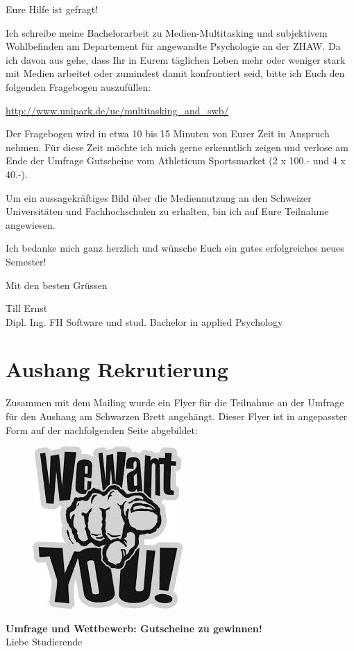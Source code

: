 \begin{RaggedRight}
Eure Hilfe ist gefragt!

Ich schreibe meine Bachelorarbeit zu Medien-Multitasking und subjektivem Wohlbefinden am Departement für angewandte Psychologie an der ZHAW. Da ich davon aus gehe, dass Ihr in Eurem täglichen Leben mehr oder weniger stark mit Medien arbeitet oder zumindest damit konfrontiert seid, bitte ich Euch den folgenden Fragebogen auszufüllen:

\url{http://www.unipark.de/uc/multitasking_and_swb/}

Der Fragebogen wird in etwa 10 bis 15 Minuten von Eurer Zeit in Anspruch nehmen. Für diese Zeit möchte ich mich gerne erkenntlich zeigen und verlose am Ende der Umfrage Gutscheine vom Athleticum Sportsmarket (2 x 100.- und 4 x 40.-).

Um ein aussagekräftiges Bild über die Mediennutzung an den Schweizer Universitäten und Fachhochschulen zu erhalten, bin ich auf Eure Teilnahme angewiesen.

Ich bedanke mich ganz herzlich und wünsche Euch ein gutes erfolgreiches neues Semester!

Mit den besten Grüssen

Till Ernst\\
Dipl. Ing. FH Software und stud. Bachelor in applied Psychology

\section{Aushang Rekrutierung}\label{appendix.aushang}
Zusammen mit dem Mailing wurde ein Flyer für die Teilnahme an der Umfrage für den Aushang am Schwarzen Brett angehängt. Dieser Flyer ist in angepasster Form auf der nachfolgenden Seite abgebildet: \newpage
\begin{figure}[h]
    \centering
    \includegraphics[scale=0.5]{images/anhang/WeWantYou.jpeg}
\end{figure}
\textbf{Umfrage und Wettbewerb: Gutscheine zu gewinnen!}\\
Liebe Studierende


\end{RaggedRight}
